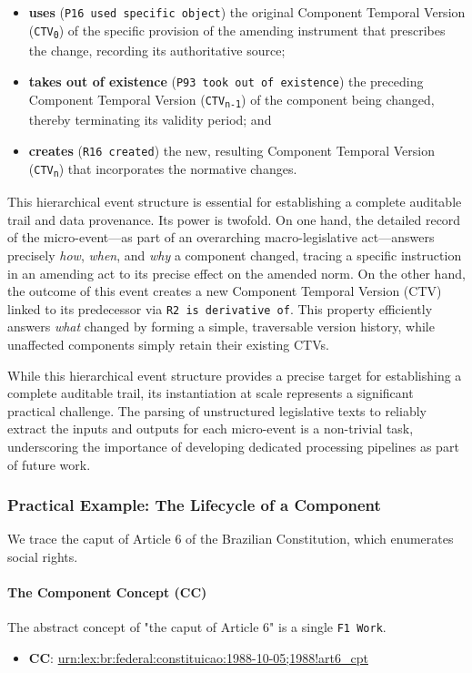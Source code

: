 \documentclass[11pt]{article}
\begin{document}
\begin{itemize}
    \item \textbf{uses} (\texttt{P16 used specific object}) the original Component Temporal Version (\texttt{CTV\textsubscript{0}})  of the specific provision of the amending instrument that prescribes the change, recording its authoritative source;
    \item \textbf{takes out of existence} (\texttt{P93 took out of existence}) the preceding Component Temporal Version (\texttt{CTV\textsubscript{n-1}}) of the component being changed, thereby terminating its validity period; and
    \item \textbf{creates} (\texttt{R16 created}) the new, resulting Component Temporal Version (\texttt{CTV\textsubscript{n}}) that incorporates the normative changes.
\end{itemize}
This hierarchical event structure is essential for establishing a complete auditable trail and data provenance. Its power is twofold. On one hand, the detailed record of the micro-event—as part of an overarching macro-legislative act—answers precisely \textit{how}, \textit{when}, and \textit{why} a component changed, tracing a specific instruction in an amending act to its precise effect on the amended norm. On the other hand, the outcome of this event creates a new Component Temporal Version (CTV) linked to its predecessor via \texttt{R2 is derivative of}. This property efficiently answers \textit{what} changed by forming a simple, traversable version history, while unaffected components simply retain their existing CTVs.  

While this hierarchical event structure provides a precise target for establishing a complete auditable trail, its instantiation at scale represents a significant practical challenge. The parsing of unstructured legislative texts to reliably extract the inputs and outputs for each micro-event is a non-trivial task, underscoring the importance of developing dedicated processing pipelines as part of future work.

\subsubsection{Practical Example: The Lifecycle of a Component}
We trace the caput of Article 6 of the Brazilian Constitution, which enumerates social rights.
\paragraph{The Component Concept (CC)}
The abstract concept of "the caput of Article 6" is a single \texttt{F1 Work}.
\begin{itemize}
\item \textbf{CC}: \url{urn:lex:br:federal:constituicao:1988-10-05;1988!art6_cpt}
\end{itemize}
\end{document}
